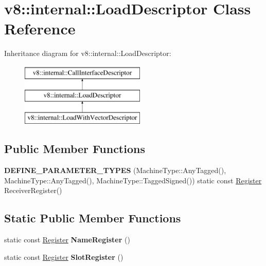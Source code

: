 \hypertarget{classv8_1_1internal_1_1LoadDescriptor}{}\section{v8\+:\+:internal\+:\+:Load\+Descriptor Class Reference}
\label{classv8_1_1internal_1_1LoadDescriptor}
Inheritance diagram for v8\+:\+:internal\+:\+:Load\+Descriptor\+:\begin{figure}[H]
\begin{center}
\leavevmode
\includegraphics[height=3.000000cm]{classv8_1_1internal_1_1LoadDescriptor}
\end{center}
\end{figure}
\subsection*{Public Member Functions}
\begin{DoxyCompactItemize}
\item 
\mbox{\label{classv8_1_1internal_1_1LoadDescriptor_afe5090ca765f8b0d6eb756bf272e6196}} 
{\bfseries D\+E\+F\+I\+N\+E\+\_\+\+P\+A\+R\+A\+M\+E\+T\+E\+R\+\_\+\+T\+Y\+P\+ES} (Machine\+Type\+::\+Any\+Tagged(), Machine\+Type\+::\+Any\+Tagged(), Machine\+Type\+::\+Tagged\+Signed()) static const \mbox{\hyperlink{classv8_1_1internal_1_1Register}{Register}} Receiver\+Register()
\end{DoxyCompactItemize}
\subsection*{Static Public Member Functions}
\begin{DoxyCompactItemize}
\item 
\mbox{\label{classv8_1_1internal_1_1LoadDescriptor_aeb0d01b8a363310665e33511301635f2}} 
static const \mbox{\hyperlink{classv8_1_1internal_1_1Register}{Register}} {\bfseries Name\+Register} ()
\item 
\mbox{\label{classv8_1_1internal_1_1LoadDescriptor_ad42a6c6dcf42886f1a1c3e6216a0b5f2}} 
static const \mbox{\hyperlink{classv8_1_1internal_1_1Register}{Register}} {\bfseries Slot\+Register} ()
\end{DoxyCompactItemize}
